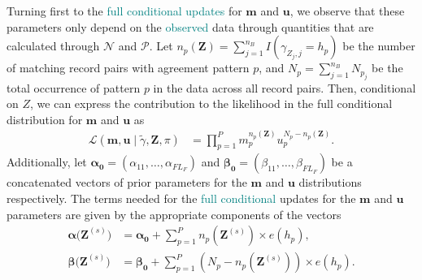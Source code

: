 \documentclass[ba]{imsart}
\begin{document}
Turning first to the \textcolor{teal}{full conditional updates}
for $\bm{m}$ and $\bm{u}$, we observe that these parameters only depend on the \textcolor{teal}{observed} data  through quantities that are calculated through $\mathcal{N}$ and $\mathcal{P}$. Let $n_p(\bm{Z}) = \sum_{j=1}^{n_B} I\left(\gamma_{Z_j, j} = h_p \right)$ be the number of matching record pairs with agreement pattern $p$, and $N_p = \sum_{j=1}^{n_B} N_{p_j}$ be the total occurrence of pattern $p$ in the data across all record pairs. Then, conditional on $Z$, we can express the contribution to the likelihood in the full conditional distribution for $\bm{m}$ and $\bm{u}$ as
\begin{align}
	\mathcal{L}(\bm{m}, \bm{u} \mid \tilde{\gamma}, \bm{Z}, \pi)  &=  \prod_{p=1}^P m_p^{n_p(\bm{Z})}u_p^{N_p - n_p(\bm{Z})}  \label{likelihood_efficient_m_u}.
\end{align}
Additionally, let $\bm{\alpha_0} = (\alpha_{11}, \ldots, \alpha_{F L_F})$ and $\bm{\beta_0}= (\beta_{11}, \ldots, \beta_{F L_F})$ be a concatenated vectors of prior parameters for the $\bm{m}$ and $\bm{u}$ distributions respectively. The terms needed for the \textcolor{teal}{full conditional} updates for the $\bm{m}$ and $\bm{u}$ parameters are given by the appropriate components of the vectors
\begin{subequations}
	\begin{align}
		\bm{\alpha(Z}^{(s)}\bm{)} &= \bm{\alpha_0} + \sum_{p=1}^P n_p\left(\bm{Z}^{(s)}\right) \times e(h_p), \label{efficient_alpha} \\
		\bm{\beta(Z}^{(s)}\bm{)} &= \bm{\beta_0} + \sum_{p=1}^P \left(N_p - n_p\left(\bm{Z}^{(s)}\right)\right) \times e(h_p). \label{efficient_beta}
	\end{align}
\end{subequations}

\end{document}
